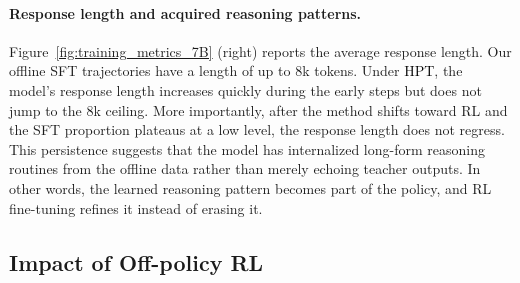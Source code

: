 \documentclass{article} %
\newcommand{\0}{\mathbb{0}}
\newcommand{\1}{\mathbb{1}}
\newcommand{\mot}{\textcolor{black}{HPT}\xspace}
\begin{document}
\paragraph{Response length and acquired reasoning patterns.}
Figure~\ref{fig:training_metrics_7B} (right) reports the average response length. Our offline SFT trajectories have a length of up to 8k tokens. Under \mot, the model’s response length increases quickly during the early steps but does not jump to the 8k ceiling.
More importantly, after the method shifts toward RL and the SFT proportion plateaus at a low level, the response length does not regress. This persistence suggests that the model has internalized long-form reasoning routines from the offline data rather than merely echoing teacher outputs. In other words, the learned reasoning pattern becomes part of the policy, and RL fine-tuning refines it instead of erasing it.



 


\subsection{Impact of Off-policy RL}
\label{sec:impact_of_off-policy_rl}


\begin{table}[!h]
\centering
\caption{Performance of different training paradigms to evaluate the impact of Off-policy RL.
\textbf{SFT/ON} denotes SFT/On-policy~(\mot), 
\textbf{OFF/ON} denotes Off-policy/On-policy,
and \textbf{Mix/ON} denotes Mix-policy/On-policy.}
\label{tab:offpolicy_rl_impact}
\end{table}
\end{document}
